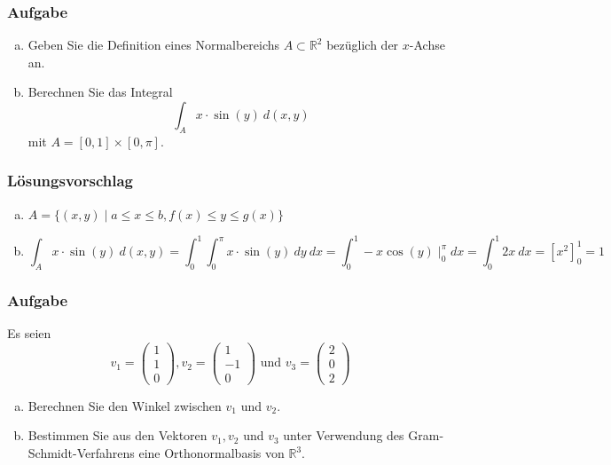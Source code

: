 \documentclass[a4paper,11pt]{scrartcl}
\newcounter{auf}
\newcommand{\Aufgabe}%
        {\addtocounter{auf}{1} \subsubsection*{\rmfamily  Aufgabe \theauf \hspace{1em}} }
\newcommand{\RR}{\mathbb{R}}
\begin{document}
\newpage
\Aufgabe


\begin{enumerate}[a)]
\item Geben Sie die Definition eines Normalbereichs $A\subset \RR^2$ bezüglich der $x$-Achse an.
\item Berechnen Sie das Integral
$$
\int_A x\cdot \sin(y)\ d(x,y)
$$
mit $A=[0,1]\times [0,\pi]$.
\end{enumerate}
%
%
\subsubsection*{Lösungsvorschlag}
\begin{enumerate}[a)]
\item $A=\{(x,y) \mid a\le x \le b, f(x) \le y \le g(x)\}$
\item 
$$
\int_A x\cdot \sin(y)\ d(x,y)= \int_0^1 \int_0^\pi x\cdot \sin(y) \ dy \ dx=\int_0^1 -x\cos(y)\mid_0^\pi dx=\int_0^1 2x\ dx = [x^2]_0^1 =1
$$
\end{enumerate}
%
%

\newpage
\Aufgabe

Es seien 
$$
v_1=\begin{pmatrix}1\\1\\0 \end{pmatrix}, v_2=\begin{pmatrix}1\\-1\\0 \end{pmatrix} \text{ und }v_3=\begin{pmatrix}2\\0\\2 \end{pmatrix}
$$

\begin{enumerate}[a)]

\item Berechnen Sie den Winkel zwischen $v_1$ und $v_2$.
\item Bestimmen Sie aus den Vektoren $v_1,v_2$ und $v_3$ unter Verwendung des Gram-Schmidt-Verfahrens eine Orthonormalbasis von $\RR^3$.

\end{enumerate}
%
%
\end{document}
